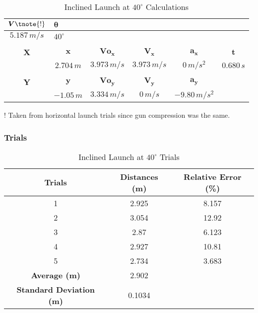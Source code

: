 \begin{table}[H]
\centering
\begin{threeparttable}
\begin{tabular}{clcccc}
$\boldsymbol{V}\tnote{!}$ & $\boldsymbol{\theta}$ &  &  &  &  \\ \hline
$5.187\,m/s$ & $40^\circ$ &  &  &  &  \\
\multicolumn{1}{l}{} &  & \multicolumn{1}{l}{} & \multicolumn{1}{l}{} & \multicolumn{1}{l}{} & \multicolumn{1}{l}{} \\
\textbf{X} & \multicolumn{1}{c}{$\boldsymbol{x}$} & $\boldsymbol{V\!o_x}$ & $\boldsymbol{V_x}$ & $\boldsymbol{a_x}$ & $\boldsymbol{t}$ \\ \hline
 & \multicolumn{1}{c}{$2.704\,m$} & $3.973\,m/s$ & $3.973\,m/s$ & $0\,m/s^2$ & $0.680\,s$ \\
\multicolumn{1}{l}{} &  & \multicolumn{1}{l}{} & \multicolumn{1}{l}{} & \multicolumn{1}{l}{} & \multicolumn{1}{l}{} \\
\textbf{Y} & \multicolumn{1}{c}{$\boldsymbol{y}$} & $\boldsymbol{V\!o_y}$ & $\boldsymbol{V_y}$ & $\boldsymbol{a_y}$ &  \\ \hline
 & \multicolumn{1}{c}{$-1.05\,m$} & $3.334\,m/s$ & $0\,m/s$ & $-9.80\,m/s^2$ & 
\end{tabular}
\begin{tablenotes}\footnotesize
	\item[!] Taken from horizontal launch trials since gun compression was the same. 
\end{tablenotes}	
\end{threeparttable}
\caption{Inclined Launch at $40^\circ$ Calculations}
\label{tab:IL40c}
\end{table}

\subsubsection{Trials}
	
\begin{table}[H]
\centering
\begin{tabular}{ccc}
\textbf{Trials} & \textbf{Distances (m)} & \textbf{Relative Error (\%)} \\ \hline
1 & 2.925 & 8.157 \\
2 & 3.054 & 12.92 \\
3 & 2.87 & 6.123 \\
4 & 2.927 & 10.81 \\
5 & 2.734 & 3.683 \\ \hline
\textbf{Average (m)} & 2.902 &  \\
\textbf{Standard Deviation (m)} & 0.1034 & 
\end{tabular}
\caption{Inclined Launch at $40^\circ$ Trials}
\label{tab:IL40t}
\end{table}

